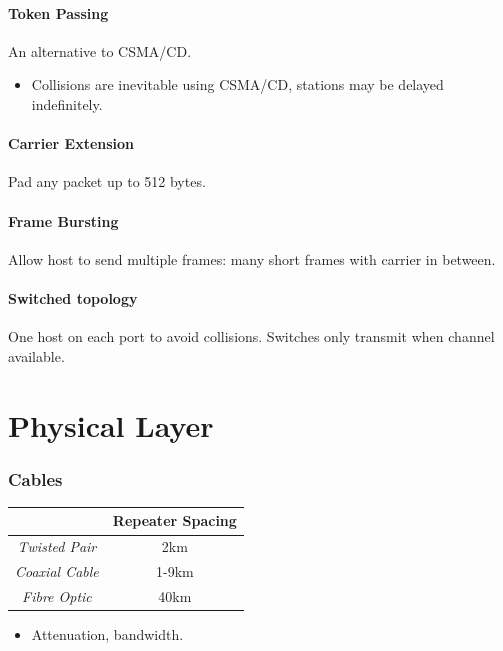 \documentclass[twocolumn,english]{article}
\providecommand{\tabularnewline}{\\}
\providecommand{\tabularnewline}{\\}
\begin{document}
\paragraph{Token Passing}

An alternative to CSMA/CD.
\begin{itemize}
\item Collisions are inevitable using CSMA/CD, stations may be delayed indefinitely.
\end{itemize}

\paragraph{Carrier Extension}

Pad any packet up to 512 bytes.

\paragraph{Frame Bursting}

Allow host to send multiple frames: many short frames with carrier
in between.

\paragraph{Switched topology}

One host on each port to avoid collisions. Switches only transmit
when channel available.

\section{Physical Layer}

\subsubsection*{Cables}

\begin{table}[H]
\centering{}%
\begin{tabular}{cc}
\toprule 
 & \textbf{Repeater Spacing}\tabularnewline
\midrule
\emph{Twisted Pair} & 2km\tabularnewline
\emph{Coaxial Cable} & 1-9km\tabularnewline
\emph{Fibre Optic} & 40km\tabularnewline
\bottomrule
\end{tabular}
\end{table}
\begin{itemize}
\item Attenuation, bandwidth.
\end{itemize}
\end{document}
